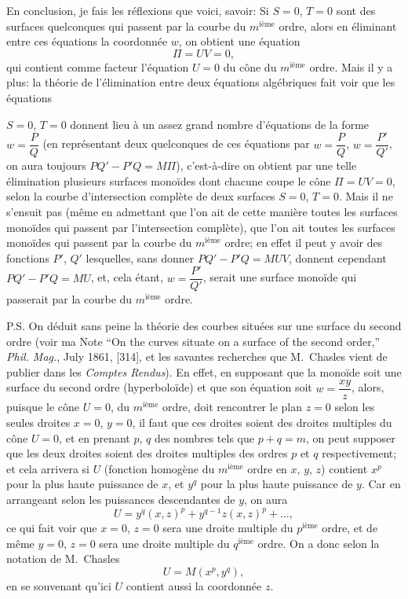 \documentclass[11pt,a4paper]{article}
\begin{document}
En conclusion, je fais les r\'{e}flexions que voici, savoir: Si $S = 0$, $T = 0$ sont des surfaces quelconques qui passent par la courbe du $m^{\text{i\`{e}me}}$ ordre, alors en \'{e}liminant entre ces \'{e}quations la coordonn\'{e}e $w$, on obtient une \'{e}quation
\[
\Pi = UV = 0,
\]
qui contient comme facteur l'\'{e}quation $U = 0$ du c\^{o}ne du $m^{\text{i\`{e}me}}$ ordre. Mais il y a plus: la th\'{e}orie de l'\'{e}limination entre deux \'{e}quations alg\'{e}briques fait voir que les \'{e}quations

\clearpage

$S = 0$, $T = 0$ donnent lieu \`{a} un assez grand nombre d'\'{e}quations de la forme $w = \dfrac{P}{Q}$ (en repr\'{e}sentant deux quelconques de ces \'{e}quations par $w = \dfrac{P}{Q}$, $w = \dfrac{P'}{Q'}$, on aura toujours $PQ' - P'Q = M\Pi$), c'est-\`{a}-dire on obtient par une telle \'{e}limination plusieurs surfaces mono\"{i}des dont chacune coupe le c\^{o}ne $\Pi = UV = 0$, selon la courbe d'intersection compl\`{e}te de deux surfaces $S = 0$, $T = 0$. Mais il ne s'ensuit pas (m\^{e}me en admettant que l'on ait de cette mani\`{e}re toutes les surfaces mono\"{i}des qui passent par l'intersection compl\`{e}te), que l'on ait toutes les surfaces mono\"{i}des qui passent par la courbe du $m^{\text{i\`{e}me}}$ ordre; en effet il peut y avoir des fonctions $P'$, $Q'$ lesquelles, sans donner $PQ' - P'Q = MUV$, donnent cependant $PQ' - P'Q = MU$, et, cela \'{e}tant, $w = \dfrac{P'}{Q'}$, serait une surface mono\"{i}de qui passerait par la courbe du $m^{\text{i\`{e}me}}$ ordre.

P.S. On d\'{e}duit sans peine la th\'{e}orie des courbes situ\'{e}es sur une surface du second ordre (voir ma Note ``On the curves situate on a surface of the second order,'' \textit{Phil. Mag.}, July 1861, [314], et les savantes recherches que M.~Chasles vient de publier dans les \textit{Comptes Rendus}). En effet, en supposant que la mono\"{i}de soit une surface du second ordre (hyperbolo\"{i}de) et que son \'{e}quation soit $w = \dfrac{xy}{z}$, alors, puisque le c\^{o}ne $U = 0$, du $m^{\text{i\`{e}me}}$ ordre, doit rencontrer le plan $z = 0$ selon les seules droites $x = 0$, $y = 0$, il faut que ces droites soient des droites multiples du c\^{o}ne $U = 0$, et en prenant $p$, $q$ des nombres tels que $p + q = m$, on peut supposer que les deux droites soient des droites multiples des ordres $p$ et $q$ respectivement; et cela arrivera si $U$ (fonction homog\`{e}ne du $m^{\text{i\`{e}me}}$ ordre en $x$, $y$, $z$) contient $x^p$ pour la plus haute puissance de $x$, et $y^q$ pour la plus haute puissance de $y$. Car en arrangeant selon les puissances descendantes de $y$, on aura
\[
U = y^q (x, z)^p + y^{q-1} z (x, z)^p + \ldots,
\]
ce qui fait voir que $x = 0$, $z = 0$ sera une droite multiple du $p^{\text{i\`{e}me}}$ ordre, et de m\^{e}me $y = 0$, $z = 0$ sera une droite multiple du $q^{\text{i\`{e}me}}$ ordre. On a donc selon la notation de M.~Chasles
\[
U = M(x^p, y^q),
\]
en se souvenant qu'ici $U$ contient aussi la coordonn\'{e}e $z$.
\end{document}
